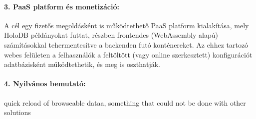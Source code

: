 \documentclass[12pt]{article}
\begin{document}
\paragraph{3. PaaS platform és monetizáció:}{
A cél egy fizetős megoldásként is működtethető PaaS platform kialakítása,
mely HoloDB példányokat futtat,
részben frontendes (WebAssembly alapú) számításokkal tehermentesítve a backenden futó konténereket.
Az ehhez tartozó webes felületen a felhasználók a feltöltött (vagy online szerkesztett)
konfigurációt adatbázisként működtethetik, és meg is oszthatják.
}

\paragraph{4. Nyilvános bemutató:}{
quick reload of browseable dataa, something that could not be done with other solutions
}
\end{document}
